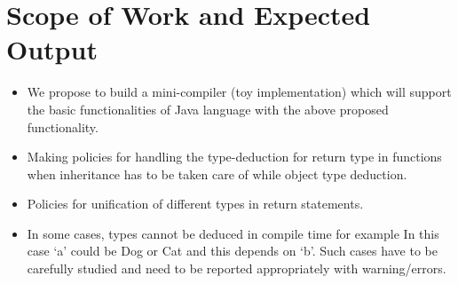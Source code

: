 \section{Scope of Work and Expected Output}
\begin{itemize}
\item We propose to build a mini-compiler (toy implementation) which will support the basic functionalities of Java language with the above proposed functionality.
\item Making policies for handling the type-deduction for return type in functions when inheritance has to be taken care of while object type deduction.
\item Policies for unification of different types in return statements.
\item In some cases, types cannot be deduced in compile time for example
In this case ‘a’ could be Dog or Cat and this depends on ‘b’. Such cases have to 
be carefully studied and need to be reported appropriately with 
warning/errors.
\end{itemize}